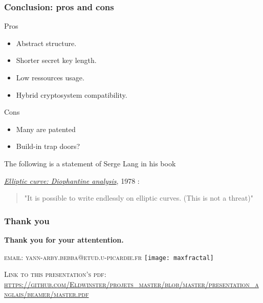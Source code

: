 \begin{frame}[t]
    \frametitle{Conclusion: pros and cons}
    Pros
    \begin{itemize}
        \item Abstract structure.
        \item Shorter secret key length.
        \item Low ressources usage.
        \item Hybrid cryptosystem compatibility.
    \end{itemize}

    Cons
    \begin{itemize}
        \item Many are patented
        \item Build-in trap doors? \cite{noauthor_how_2014} \cite{goodin_we_2013}
    \end{itemize}

    \begin{center}
    The following is a statement of Serge Lang in his book

    \textit{\underline{Elliptic curve:
    Diophantine analysis}}, 1978 \cite{lang_auth_elliptic_1978}: 
    \begin{quote}
       "It is possible to write endlessly on elliptic curves. (This is not a threat)"
    \end{quote}
    \end{center}
\end{frame}

\begin{frame}[t]
    \frametitle{Thank you}
    \begin{center}
    {\huge\bfseries Thank you for your attentention.}

    \textsc{\Large email: yann-arby.bebba@etud.u-picardie.fr}
    \texttt{[image: maxfractal]}

    \textsc{\Large Link to this presentation's pdf:}
    \textsc{\Large
        \url{https://github.com/Eldwinster/projets_master/blob/master/presentation_anglais/beamer/master.pdf}}
    \end{center}
\end{frame}
